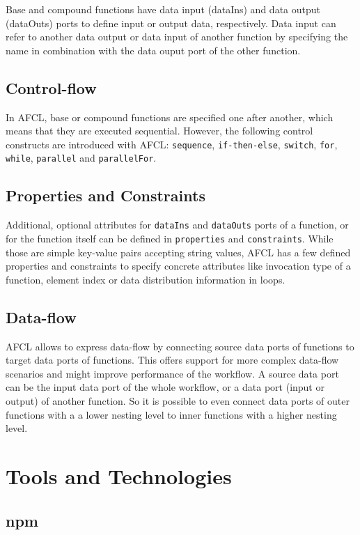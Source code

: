 \documentclass[a4paper,top=25mm,bottom=25mm,12pt,pdftex,halfparskip,twoside,bibtotoc,numbers=noenddot]{scrbook}
\begin{document}
Base and compound functions have data input (dataIns) and data output (dataOuts) ports to define input or output data, respectively.
Data input can refer to another data output or data input of another function by specifying the name in combination with the data ouput port of the other function.

\subsection{Control-flow}
In AFCL, base or compound functions are specified one after another, which means that they are executed sequential. However, the following control constructs are introduced with AFCL: \texttt{sequence}, \texttt{if-then-else}, \texttt{switch}, \texttt{for}, \texttt{while}, \texttt{parallel} and \texttt{parallelFor}.


\subsection{Properties and Constraints}

Additional, optional attributes for \texttt{dataIns} and \texttt{dataOuts} ports of a function, or for the function itself can be defined in \texttt{properties} and \texttt{constraints}. While those are simple key-value pairs accepting string values, AFCL has a few defined properties and constraints to specify concrete attributes like invocation type of a function, element index or data distribution information in loops.

\subsection{Data-flow}
AFCL allows to express data-flow by connecting source data ports of functions to target data ports of functions. This offers support for more complex data-flow scenarios and might improve performance of the workflow. A source data port can be the input data port of the whole workflow, or a data port (input or output) of another function. So it is possible to even connect data ports of outer functions with a a lower nesting level to inner functions with a higher nesting level. 

\section{Tools and Technologies}
\subsection{npm}
\end{document}
